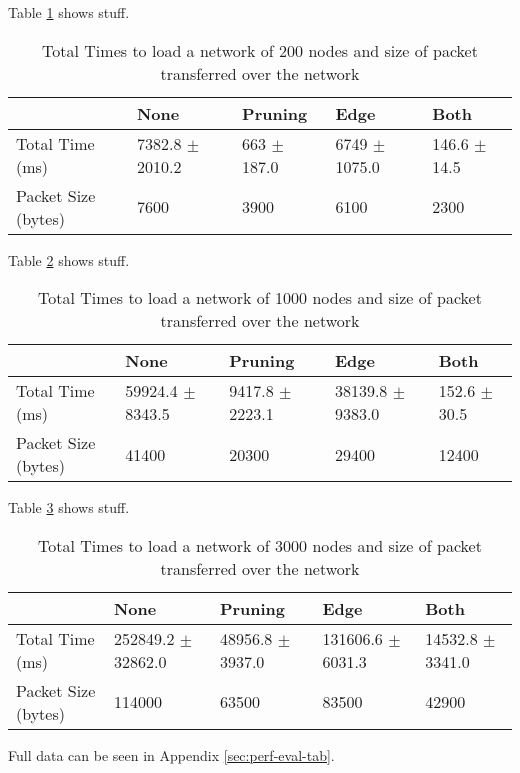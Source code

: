 \documentclass[../dissertation.tex]{subfiles}
\begin{document}
Table \ref{table:200-nodes} shows stuff.

\begin{table}[ht]
\centering
\begin{tabular}{|l|l|l|l|l|}
\hline
                    & None              & Pruning         & Edge            & Both           \\ \hline
Total Time (ms)     & 7382.8 $\pm$ 2010.2 & 663 $\pm$ 187.0   & 6749 $\pm$ 1075.0 & 146.6 $\pm$ 14.5 \\ \hline
Packet Size (bytes) & 7600              & 3900            & 6100            & 2300           \\ \hline
\end{tabular}
\caption{Total Times to load a network of 200 nodes and size of packet transferred over the network}
\label{table:200-nodes}
\end{table}

Table \ref{table:1000-nodes} shows stuff.

\begin{table}[ht]
\centering
\begin{tabular}{|l|l|l|l|l|}
\hline
                    & None               & Pruning            & Edge               & Both           \\ \hline
Total Time (ms)     & 59924.4 $\pm$ 8343.5 & 9417.8 $\pm$ 2223.1  & 38139.8 $\pm$ 9383.0 & 152.6 $\pm$ 30.5 \\ \hline
Packet Size (bytes) & 41400              & 20300              & 29400              & 12400          \\ \hline
\end{tabular}
\caption{Total Times to load a network of 1000 nodes and size of packet transferred over the network}
\label{table:1000-nodes}
\end{table}

Table \ref{table:3000-nodes} shows stuff.

\begin{table}[ht]
\centering
\begin{tabular}{|l|l|l|l|l|}
\hline
                    & None                 & Pruning            & Edge                & Both                \\ \hline
Total Time (ms)     & 252849.2 $\pm$ 32862.0 & 48956.8 $\pm$ 3937.0 & 131606.6 $\pm$ 6031.3 & 14532.8 $\pm$ 3341.0  \\ \hline
Packet Size (bytes) & 114000               & 63500              & 83500               & 42900               \\ \hline
\end{tabular}
\caption{Total Times to load a network of 3000 nodes and size of packet transferred over the network}
\label{table:3000-nodes}
\end{table}

Full data can be seen in Appendix \ref{sec:perf-eval-tab}.
\end{document}
